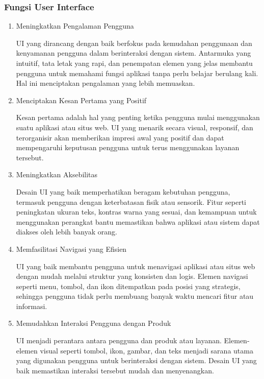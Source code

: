 \documentclass[12pt]{article}
\begin{document}
\subsubsection{Fungsi User Interface}
\begin{enumerate}
    \item Meningkatkan Pengalaman Pengguna 
    
    UI yang dirancang dengan baik berfokus pada kemudahan penggunaan dan kenyamanan pengguna dalam berinteraksi dengan sistem. Antarmuka yang intuitif, tata letak yang rapi, dan penempatan elemen yang jelas membantu pengguna untuk memahami fungsi aplikasi tanpa perlu belajar berulang kali. Hal ini menciptakan pengalaman yang lebih memuaskan.

    \item Menciptakan Kesan Pertama yang Positif

    Kesan pertama adalah hal yang penting ketika pengguna mulai menggunakan suatu aplikasi atau situs web. UI yang menarik secara visual, responsif, dan terorganisir akan memberikan impresi awal yang positif dan dapat mempengaruhi keputusan pengguna untuk terus menggunakan layanan tersebut.

    \item Meningkatkan Aksebilitas

    Desain UI yang baik memperhatikan beragam kebutuhan pengguna, termasuk pengguna dengan keterbatasan fisik atau sensorik. Fitur seperti peningkatan ukuran teks, kontras warna yang sesuai, dan kemampuan untuk menggunakan perangkat bantu memastikan bahwa aplikasi atau sistem dapat diakses oleh lebih banyak orang.

    \item Memfasilitasi Navigasi yang Efisien

    UI yang baik membantu pengguna untuk menavigasi aplikasi atau situs web dengan mudah melalui struktur yang konsisten dan logis. Elemen navigasi seperti menu, tombol, dan ikon ditempatkan pada posisi yang strategis, sehingga pengguna tidak perlu membuang banyak waktu mencari fitur atau informasi.
    \item Memudahkan Interaksi Pengguna dengan Produk

    UI menjadi perantara antara pengguna dan produk atau layanan. Elemen-elemen visual seperti tombol, ikon, gambar, dan teks menjadi sarana utama yang digunakan pengguna untuk berinteraksi dengan sistem. Desain UI yang baik memastikan interaksi tersebut mudah dan menyenangkan.
\end{enumerate}
\end{document}
